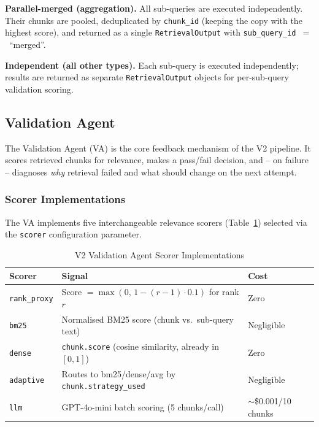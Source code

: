 \textbf{Parallel-merged (aggregation).} All sub-queries are executed
independently. Their chunks are pooled, deduplicated by \texttt{chunk\_id}
(keeping the copy with the highest score), and returned as a single
\texttt{RetrievalOutput} with \texttt{sub\_query\_id}~$=$~``merged''.

\textbf{Independent (all other types).} Each sub-query is executed
independently; results are returned as separate \texttt{RetrievalOutput}
objects for per-sub-query validation scoring.


\subsection{Validation Agent}
\label{subsec:v2_validation}

The Validation Agent (VA) is the core feedback mechanism of the V2 pipeline.
It scores retrieved chunks for relevance, makes a pass/fail decision, and --
on failure -- diagnoses \emph{why} retrieval failed and what should change on
the next attempt.

\subsubsection*{Scorer Implementations}

The VA implements five interchangeable relevance scorers
(Table~\ref{tab:v2_scorers}) selected via the \texttt{scorer} configuration
parameter.

\begin{table}[H]
\centering
\caption{V2 Validation Agent Scorer Implementations}
\label{tab:v2_scorers}
\begin{tabular}{lll}
\toprule
\textbf{Scorer} & \textbf{Signal} & \textbf{Cost} \\
\midrule
\texttt{rank\_proxy}  & Score $= \max(0,\, 1 - (r{-}1) \cdot 0.1)$ for rank $r$ & Zero \\
\texttt{bm25}         & Normalised BM25 score (chunk vs.\ sub-query text) & Negligible \\
\texttt{dense}        & \texttt{chunk.score} (cosine similarity, already in $[0,1]$) & Zero \\
\texttt{adaptive}     & Routes to bm25/dense/avg by \texttt{chunk.strategy\_used} & Negligible \\
\texttt{llm}          & GPT-4o-mini batch scoring (5 chunks/call) & $\sim$\$0.001/10 chunks \\
\bottomrule
\end{tabular}
\end{table}

